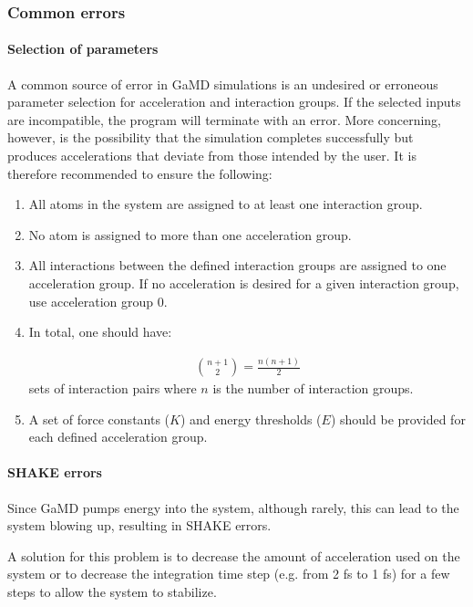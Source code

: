 \subsubsection{Common errors}

\paragraph{Selection of parameters}
A common source of error in GaMD simulations is an undesired or erroneous parameter selection for acceleration and interaction groups. If the selected inputs are incompatible, the program will terminate with an error. More concerning, however, is the possibility that the simulation completes successfully but produces accelerations that deviate from those intended by the user.
It is therefore recommended to ensure the following:

\begin{enumerate}
  \item[-] All atoms in the system are assigned to at least one interaction group.
  \item[-] No atom is assigned to more than one acceleration group.
  \item[-] All interactions between the defined interaction groups are assigned to one acceleration group. If no acceleration is desired for a given interaction group, use acceleration group 0. 
  \item[-] In total, one should have: 

  \begin{equation}
  \begin{aligned}
  \binom{n + 1}{2} = \frac{n(n + 1)}{2}
  \end{aligned}
\end{equation}
  sets of interaction pairs where $n$ is the number of interaction groups.
  \item[-] A set of force constants ($K$) and energy thresholds ($E$) should be provided for each defined acceleration group.
\end{enumerate}

\paragraph{SHAKE errors}
Since GaMD pumps energy into the system, although rarely, this can lead to the system blowing up, resulting in SHAKE errors. 

A solution for this problem is to decrease the amount of acceleration used on the system or to decrease the integration time step (e.g. from 2 fs to 1 fs) for a few steps to allow the system to stabilize.
